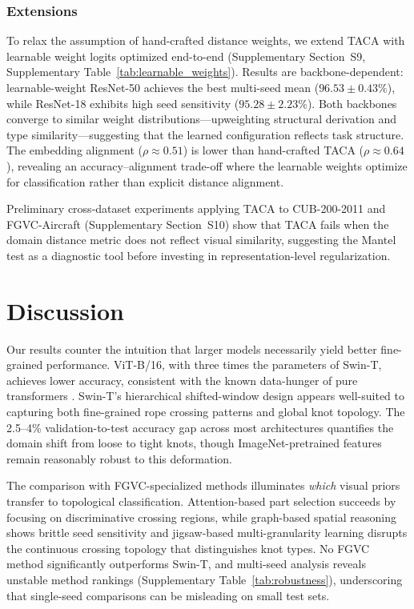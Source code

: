 \documentclass[preprint,review,12pt]{elsarticle}
\begin{document}
\subsubsection{Extensions}

To relax the assumption of hand-crafted distance weights, we extend TACA with learnable weight logits optimized end-to-end (Supplementary Section~S9, Supplementary Table~\ref{tab:learnable_weights}). Results are backbone-dependent: learnable-weight ResNet-50 achieves the best multi-seed mean ($96.53 \pm 0.43\%$), while ResNet-18 exhibits high seed sensitivity ($95.28 \pm 2.23\%$). Both backbones converge to similar weight distributions---upweighting structural derivation and type similarity---suggesting that the learned configuration reflects task structure. The embedding alignment ($\rho \approx 0.51$) is lower than hand-crafted TACA ($\rho \approx 0.64$), revealing an accuracy--alignment trade-off where the learnable weights optimize for classification rather than explicit distance alignment.

Preliminary cross-dataset experiments applying TACA to CUB-200-2011 \citep{wah2011cub} and FGVC-Aircraft \citep{maji2013fgvcaircraft} (Supplementary Section~S10) show that TACA fails when the domain distance metric does not reflect visual similarity, suggesting the Mantel test as a diagnostic tool before investing in representation-level regularization.


\section{Discussion}
\label{sec:discussion}

Our results counter the intuition that larger models necessarily yield better fine-grained performance. ViT-B/16, with three times the parameters of Swin-T, achieves lower accuracy, consistent with the known data-hunger of pure transformers \citep{dosovitskiy2021vit}. Swin-T's hierarchical shifted-window design appears well-suited to capturing both fine-grained rope crossing patterns and global knot topology. The 2.5--4\% validation-to-test accuracy gap across most architectures quantifies the domain shift from loose to tight knots, though ImageNet-pretrained features remain reasonably robust to this deformation.

The comparison with FGVC-specialized methods illuminates \emph{which} visual priors transfer to topological classification. Attention-based part selection succeeds by focusing on discriminative crossing regions, while graph-based spatial reasoning shows brittle seed sensitivity and jigsaw-based multi-granularity learning disrupts the continuous crossing topology that distinguishes knot types. No FGVC method significantly outperforms Swin-T, and multi-seed analysis reveals unstable method rankings (Supplementary Table~\ref{tab:robustness}), underscoring that single-seed comparisons can be misleading on small test sets.
\end{document}

